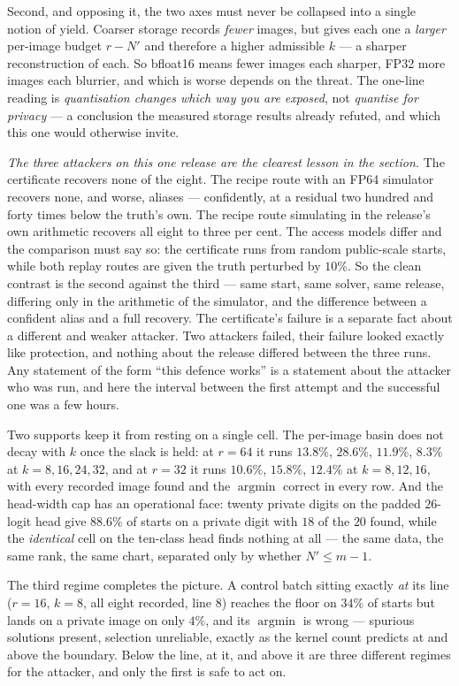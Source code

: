 Second, and opposing it, the two axes must never be collapsed into a single
notion of yield. Coarser storage records \emph{fewer} images, but gives each
one a \emph{larger} per-image budget $r-N'$ and therefore a higher admissible
$k$ --- a sharper reconstruction of each. So bfloat16 means fewer images each
sharper, FP32 more images each blurrier, and which is worse depends on the
threat. The one-line reading is \emph{quantisation changes which way you are
exposed}, not \emph{quantise for privacy} --- a conclusion the measured
storage results already refuted, and which this one would otherwise invite.

\emph{The three attackers on this one release are the clearest lesson in the
section.} The certificate recovers none of the eight. The recipe route with an
FP64 simulator recovers none, and worse, aliases --- confidently, at a
residual two hundred and forty times below the truth's own. The recipe route
simulating in the release's own arithmetic recovers all eight to three per
cent. The access models differ and the comparison must say so: the certificate
runs from random public-scale starts, while both replay routes are given the
truth perturbed by $10\%$. So the clean contrast is the second against the
third --- same start, same solver, same release, differing only in the
arithmetic of the simulator, and the difference between a confident alias and
a full recovery. The certificate's failure is a separate fact about a
different and weaker attacker. Two attackers failed, their failure looked
exactly like protection, and nothing about the release differed between the
three runs. Any statement of the form
``this defence works'' is a statement about the attacker who was run, and here
the interval between the first attempt and the successful one was a few
hours.

Two supports keep it from resting on a single cell. The per-image basin does
not decay with $k$ once the slack is held: at $r=64$ it runs $13.8\%$,
$28.6\%$, $11.9\%$, $8.3\%$ at $k=8,16,24,32$, and at $r=32$ it runs $10.6\%$,
$15.8\%$, $12.4\%$ at $k=8,12,16$, with every recorded image found and the
$\operatorname{argmin}$ correct in every row. And the head-width cap has an
operational face: twenty private digits on the padded $26$-logit head give
$88.6\%$ of starts on a private digit with $18$ of the $20$ found, while the
\emph{identical} cell on the ten-class head finds nothing at all --- the same
data, the same rank, the same chart, separated only by whether $N'\le m-1$.

The third regime completes the picture. A control batch sitting exactly
\emph{at} its line ($r=16$, $k=8$, all eight recorded, line $8$) reaches the
floor on $34\%$ of starts but lands on a private image on only $4\%$, and its
$\operatorname{argmin}$ is wrong --- spurious solutions present, selection
unreliable, exactly as the kernel count predicts at and above the boundary.
Below the line, at it, and above it are three different regimes for the
attacker, and only the first is safe to act on.

